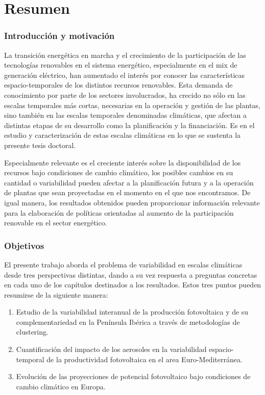 \chapter*{Resumen\label{cha:resumen}}

\subsection{Introducci\'on y motivaci\'on}

La transición energética en marcha y el crecimiento de la participación de las tecnologías renovables en el sistema energético, especialmente en el mix de generación eléctrico, han aumentado el interés por conocer las características espacio-temporales de los distintos recursos renovables. Esta demanda de conocimiento por parte de los sectores involucrados, ha crecido no sólo en las escalas temporales más cortas, necesarias en la operación y gestión de las plantas, sino también en las escalas temporales denominadas climáticas, que afectan a distintas etapas de su desarrollo como la planificación y la financiación. Es en el estudio y caracterización de estas escalas climáticas en lo que se sustenta la presente tesis doctoral.

Especialmente relevante es el creciente interés sobre la disponibilidad de los recursos bajo condiciones de cambio climático, los posibles cambios en su cantidad o variabilidad pueden afectar a la planificación futura y a la operación de plantas que sean proyectadas en el momento en el que nos encontramos. De igual manera, los resultados obtenidos pueden proporcionar información relevante para la elaboración de políticas orientadas al aumento de la participación renovable en el sector energético.

\subsection{Objetivos}

El presente trabajo aborda el problema de variabilidad en escalas climáticas desde tres perspectivas distintas, dando a su vez respuesta a preguntas concretas en cada uno de los capítulos destinados a los resultados. Estos tres puntos pueden resumirse de la siguiente manera:

\begin{enumerate}
\item Estudio de la variabilidad interanual de la producción fotovoltaica y de su complementariedad en la Península Ibérica a través de metodologías de clustering.
\item Cuantificación del impacto de los aerosoles en la variabilidad espacio-temporal de la productividad fotovoltaica en el area Euro-Mediterránea.
\item Evolución de las proyecciones de potencial fotovoltaico bajo condiciones de cambio climático en Europa.
\end{enumerate}

